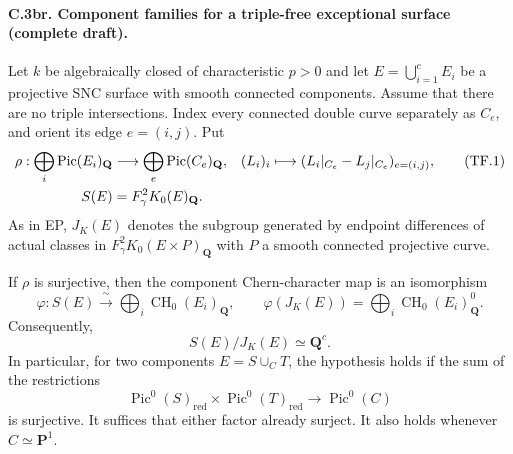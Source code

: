 \paragraph{C.3br. Component families for a triple-free exceptional surface
(complete draft).}
Let $k$ be algebraically closed of characteristic $p>0$ and let
$E=\bigcup_{i=1}^cE_i$ be a projective SNC surface with smooth connected
components. Assume that there are no triple intersections.
Index every connected double curve separately as $C_e$, and orient its
edge $e=(i,j)$. Put
\begin{align}
 \rho:\bigoplus_i\operatorname{Pic}(E_i)_{\mathbf Q}
   &\longrightarrow\bigoplus_e\operatorname{Pic}(C_e)_{\mathbf Q},
 & (L_i)_i&\longmapsto
       (L_i|_{C_e}-L_j|_{C_e})_{e=(i,j)},                 \tag{TF.1}\\
 S(E)&=F_\gamma^2K_0(E)_{\mathbf Q}. \notag
\end{align}
As in EP, $J_K(E)$ denotes the subgroup generated by endpoint
differences of actual classes in $F_\gamma^2K_0(E\times P)_{\mathbf Q}$
with $P$ a smooth connected projective curve.

If $\rho$ is surjective, then the component Chern-character map is an
isomorphism
\begin{equation}
 \varphi:S(E)\xrightarrow{\ \sim\ }
                     \bigoplus_i\operatorname{CH}_0(E_i)_{\mathbf Q},
 \qquad
 \varphi(J_K(E))=\bigoplus_i\operatorname{CH}_0(E_i)^0_{\mathbf Q}.
                                                               \tag{TF.2}
\end{equation}
Consequently,
\begin{equation}
                       S(E)/J_K(E)\simeq\mathbf Q^c.     \tag{TF.3}
\end{equation}
In particular, for two components $E=S\cup_C T$, the hypothesis
holds if the sum of the restrictions
\begin{equation}
 \operatorname{Pic}^0(S)_{\mathrm{red}}\times
 \operatorname{Pic}^0(T)_{\mathrm{red}}\longrightarrow
                          \operatorname{Pic}^0(C)        \tag{TF.4}
\end{equation}
is surjective. It suffices that either factor already surject.
It also holds whenever $C\simeq\mathbf P^1$.


